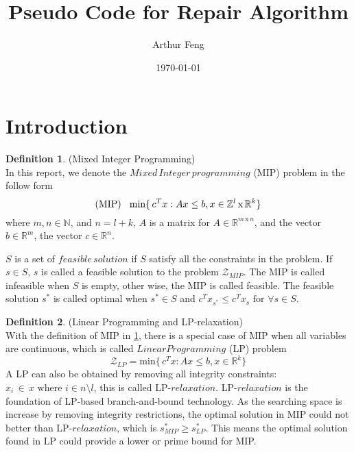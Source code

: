 \documentclass[11pt]{article}
\title{Pseudo Code for Repair Algorithm}
\author{Arthur Feng}
\date{\today}
\theoremstyle{definition}
\newtheorem{definition}{Definition}[section] %
\begin{document}
\maketitle

\section{Introduction}
\begin{definition}
(Mixed Integer Programming)\\
In this report, we denote the $Mixed\,Integer\, programming$ (MIP) problem in the follow form $$\text{(MIP)}  \hspace{3mm} \text{min} \{\, c^Tx : Ax \leq b, x \in \mathbb{Z}^l\,\text{x}\,\mathbb{R}^k \}  $$ 
where $m,n \in \mathbb{N}$, and $n = l + k $,  $A$ is a matrix for $A \in \mathbb{R}^{m \,\text{x}\, n}$, and the vector $b \in \mathbb{R}^m$, the vector $c \in \mathbb{R}^n$. \par
$S$ is a set of $feasible\,solution$ if $S$ satisfy all the constraints in the problem. If $s \in S$, $s$ is called a feasible solution to the problem $\mathcal{Z}_{MIP}$. The MIP is called infeasible when $S$ is empty, other wise, the MIP is called feasible. The feasible solution $s^\ast$ is called optimal when $s^\ast \in S $ and  $ c^Tx_{s^\ast} \leq c^Tx_s \text{ for } \forall s \in S $. \par
\label{dif:def_MIP}
\end{definition}

\begin{definition}
(Linear Programming and LP-relaxation)\\
With the definition of MIP in \ref{dif:def_MIP}, there is a special case of MIP when all variables are continuous, which is called $Linear Programming $ (LP) problem
$$\mathcal{Z}_{LP} = \text{min} \{\, c^Tx : Ax \leq b, x \in \mathbb{R}^k \}  $$ 
A LP can also be obtained by removing all integrity constraints: $x_i\, \in\, x \text{ where } i \in n \setminus l $, this is called LP-$relaxation$. LP-$relaxation$ is the foundation of LP-based branch-and-bound technology. As the searching space is increase by removing integrity restrictions, the optimal solution in MIP could not better than LP-$relaxation$, which is  $s_{MIP}^\ast \geq s_{LP}^\ast $. This means the optimal solution found in LP could provide a lower or prime bound for MIP.
\label{dif:def_lp}
\end{definition}
\end{document}
